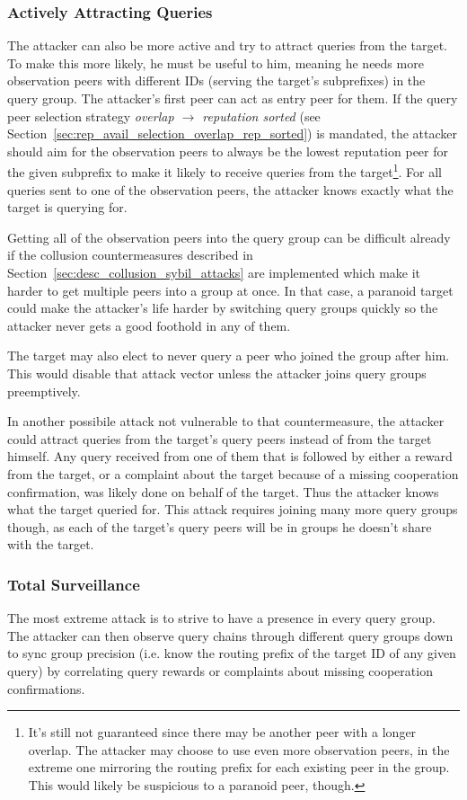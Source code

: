 \subsubsection{Actively Attracting Queries}
The attacker can also be more active and try to attract queries from the target.
To make this more likely, he must be useful to him, meaning he needs more
observation peers with different IDs (serving the target's subprefixes) in the
query group. The attacker's first peer can act as entry peer for them. If the
query peer selection strategy \emph{overlap $\rightarrow$ reputation sorted}
(see Section~\ref{sec:rep_avail_selection_overlap_rep_sorted}) is mandated, the
attacker should aim for the observation peers to always be the lowest reputation
peer for the given subprefix to make it likely to receive queries from the
target\footnote{It's still not guaranteed since there may be another peer with a
longer overlap. The attacker may choose to use even more observation peers, in
the extreme one mirroring the routing prefix for each existing peer in the
group. This would likely be suspicious to a paranoid peer, though.}. For all
queries sent to one of the observation peers, the attacker knows exactly what
the target is querying for.

Getting all of the observation peers into the query group can be difficult
already if the collusion countermeasures described in
Section~\ref{sec:desc_collusion_sybil_attacks} are implemented which make it
harder to get multiple peers into a group at once. In that case, a paranoid
target could make the attacker's life harder by switching query groups quickly
so the attacker never gets a good foothold in any of them.

The target may also elect to never query a peer who joined the group after him.
This would disable that attack vector unless the attacker joins query groups
preemptively.

In another possibile attack not vulnerable to that countermeasure, the attacker
could attract queries from the target's query peers instead of from the target
himself. Any query received from one of them that is followed by either a reward
from the target, or a complaint about the target because of a missing
cooperation confirmation, was likely done on behalf of the target. Thus the
attacker knows what the target queried for. This attack requires joining many
more query groups though, as each of the target's query peers will be in groups
he doesn't share with the target.

\subsubsection{Total Surveillance}
The most extreme attack is to strive to have a presence in every query group.
The attacker can then observe query chains through different query groups down
to sync group precision (i.e. know the routing prefix of the target ID of any
given query) by correlating query rewards or complaints about missing
cooperation confirmations.


